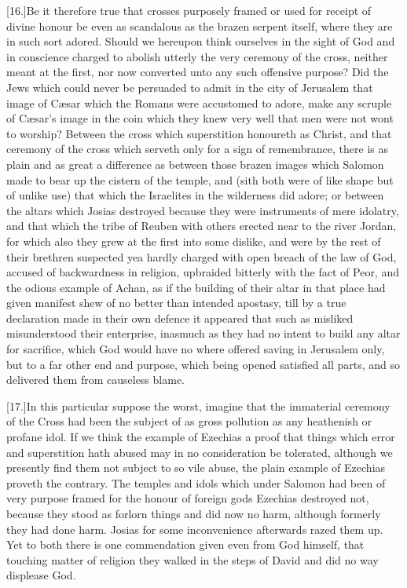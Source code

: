 [16.]Be it therefore true that crosses purposely framed or used for receipt of divine honour be even as scandalous as the brazen serpent itself, where they are in such sort adored. Should we hereupon think ourselves in the sight of God and in conscience charged to abolish utterly the very ceremony of the cross, neither meant at the first, nor now converted unto any such offensive purpose? Did the Jews which could never be persuaded to admit in the city of Jerusalem that image of Cæsar which the Romans were accustomed to adore,  make any scruple of Cæsar’s image in the coin which they knew very well that men were not wont to worship?
 Between the cross which superstition honoureth as Christ, and that ceremony of the cross which serveth only for a sign of remembrance, there is as plain and as great a difference as between those brazen images which Salomon made to bear up the cistern of the temple, and (sith both were of like shape but of unlike use) that which the Israelites in the wilderness did adore; or between the altars which Josias destroyed because they were instruments of mere idolatry, and that which the tribe of Reuben with others erected near to the river Jordan, for which also they grew at the first into some dislike, and were by the rest of their brethren suspected yea hardly charged with open breach of the law of God, accused of backwardness in religion, upbraided bitterly with the fact of Peor, and the odious example of Achan, as if the building of their altar in that place had given manifest shew of no better than intended apostasy, till by a true declaration made in their own defence it appeared that such as misliked misunderstood their enterprise, inasmuch as they had no intent to build any altar for sacrifice, which God would have no where offered saving in Jerusalem only, but to a far other end and purpose, which being opened satisfied all parts, and so delivered them from causeless blame.

[17.]In this particular suppose the worst, imagine that the immaterial ceremony of the Cross had been the subject of as gross pollution as any heathenish or profane idol. If we think the example of Ezechias a proof that things which error and superstition hath abused may in no consideration be tolerated, although we presently find them not subject to so vile abuse, the plain example of Ezechias proveth the contrary. The temples and idols which under Salomon had been of very purpose framed for the honour of foreign gods Ezechias destroyed not, because they stood as forlorn things and did now  no harm, although formerly they had done harm.
 Josias for some inconvenience afterwards razed them up. Yet to both there is one commendation given even from God himself, that touching matter of religion they walked in the steps of David and did no way displease God.


